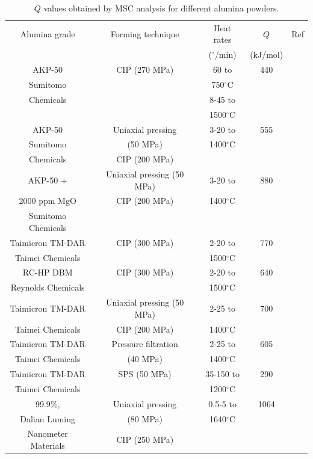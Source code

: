 \newpage
\begin{table}[H]
	\caption{$Q$ values obtained by MSC analysis for different alumina powders.}
	\centering
	\begin{tabular}{ | c | c | c | c | c | }
		\hline
		Alumina grade & Forming technique & Heat rates & $Q$ & Ref\\
		& & ($^{\circ}$/min) & (kJ/mol) & \\
		\hline
		AKP-50 & CIP (270 MPa) & 60 to & 440 & \cite{Su1996a}\\
		Sumitomo & & 750$^{\circ}$C & & \\
		Chemicals & & 8-45 to & & \\ 
		& & 1500$^{\circ}$C & & \\
		\hline
		AKP-50 & Uniaxial pressing & 3-20 to & 555 & \cite{Tatami2006} \\
		Sumitomo & (50 MPa) & 1400$^{\circ}$C & & \\
		Chemicals & CIP (200 MPa) & & & \\
		\hline
		AKP-50 +  & Uniaxial pressing (50 MPa) & 3-20 to & 880 & \cite{Tatami2006} \\
		2000 ppm MgO & CIP (200 MPa) & 1400$^{\circ}$C & & \\
		Sumitomo Chemicals & & & & \\
		\hline
		Taimicron TM-DAR & CIP (300 MPa) & 2-20 to & 770 & \cite{Pouchly2009}\\
		Taimei Chemicals & & 1500$^{\circ}$C & & \\
		\hline
		RC-HP DBM & CIP (300 MPa) & 2-20 to & 640 & \cite{Pouchly2009}\\
		Reynolds Chemicals & & 1500$^{\circ}$C & & \\
		\hline
		Taimicron TM-DAR & Uniaxial pressing (50 MPa) & 2-25 to & 700 & \cite{Aminzare2010}\\
		Taimei Chemicals & CIP (200 MPa) & 1400$^{\circ}$C & & \\
		\hline
		Taimicron TM-DAR & Pressure filtration & 2-25 to & 605 & \cite{Aminzare2010}\\
		Taimei Chemicals & (40 MPa) & 1400$^{\circ}$C & & \\
		\hline
		Taimicron TM-DAR & SPS (50 MPa) & 35-150 to & 290 & \cite{Guillon2010}\\
		Taimei Chemicals & & 1200$^{\circ}$C & & \\
		\hline
		99.9\%, & Uniaxial pressing & 0.5-5 to & 1064 & \cite{Shao2009}\\
		Dalian Luming & (80 MPa) & 1640$^{\circ}$C & & \\
		Nanometer Materials & CIP (250 MPa) & & & \\
		\hline
	\end{tabular}
	\label{Ch6-table:table1}
\end{table}


